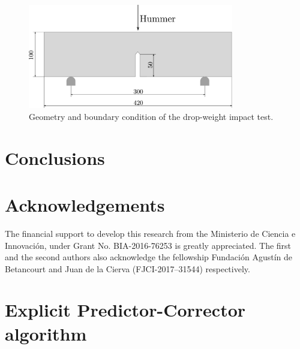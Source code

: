 \message{ !name(2020_EFM_MPM_Eigensoftening.tex)}\documentclass[preprint,12pt,a4paper]{elsarticle}
\begin{document}
\begin{figure}
  \centering
  \includegraphics[width=0.8\textwidth]{Figures/Drop_weight}
  \caption{Geometry and boundary condition of the drop-weight impact test.}
  \label{fig:geometry-drop-weight-impact-test}
\end{figure}


\section{Conclusions}
\label{sec:6}


\section*{Acknowledgements}
The financial support to develop this research from the Ministerio de
Ciencia e Innovaci\'on, under Grant No. BIA-2016-76253 is greatly
appreciated. The first and the second authors also acknowledge the
fellowship Fundaci\'on Agust\'in de Betancourt and Juan de la Cierva
(FJCI-2017–31544) respectively.

\appendix

\clearpage

\section{Explicit Predictor-Corrector algorithm}
\label{sec:expl-pred-corr}
\end{document}
